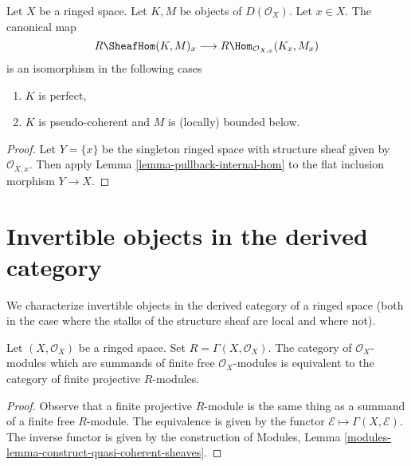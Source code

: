 \begin{lemma}
\label{lemma-stalk-internal-hom}
Let $X$ be a ringed space. Let $K, M$ be objects of $D(\mathcal{O}_X)$.
Let $x \in X$. The canonical map
$$
R\SheafHom(K, M)_x \longrightarrow
R\Hom_{\mathcal{O}_{X, x}}(K_x, M_x)
$$
is an isomorphism in the following cases
\begin{enumerate}
\item $K$ is perfect,
\item $K$ is pseudo-coherent and $M$ is (locally) bounded below.
\end{enumerate}
\end{lemma}

\begin{proof}
Let $Y = \{x\}$ be the singleton ringed space with structure sheaf
given by $\mathcal{O}_{X, x}$. Then apply
Lemma \ref{lemma-pullback-internal-hom}
to the flat inclusion morphism $Y \to X$.
\end{proof}







\section{Invertible objects in the derived category}
\label{section-invertible-D-or-R}

\noindent
We characterize invertible objects in the derived category of
a ringed space (both in the case where the stalks of the
structure sheaf are local and where not).

\begin{lemma}
\label{lemma-category-summands-finite-free}
Let $(X, \mathcal{O}_X)$ be a ringed space.
Set $R = \Gamma(X, \mathcal{O}_X)$. The category of
$\mathcal{O}_X$-modules which are summands of finite free
$\mathcal{O}_X$-modules is equivalent to the category of
finite projective $R$-modules.
\end{lemma}

\begin{proof}
Observe that a finite projective $R$-module is the same thing
as a summand of a finite free $R$-module.
The equivalence is given by the functor $\mathcal{E} \mapsto
\Gamma(X, \mathcal{E})$. The inverse functor is given by the construction of
Modules, Lemma \ref{modules-lemma-construct-quasi-coherent-sheaves}.
\end{proof}

